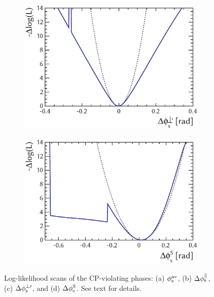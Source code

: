 \begin{figure}[tb]
  \vspace*{0.02\textwidth}
  \begin{subfigure}{0.49\textwidth}
    \includegraphics[width=\textwidth]{graphics/results/NLL_polarDep_phiCPRel_AperpApar}
    \caption{}
    \label{fig:NLL_CPV_phases_phiCPRel_AperpApar}
  \end{subfigure}
  \hfill%
  \begin{subfigure}{0.49\textwidth}
    \includegraphics[width=\textwidth]{graphics/results/NLL_polarDep_phiCPRel_AS}
    \caption{}
  \end{subfigure}

  \caption{Log-likelihood scans of the CP-violating phases: (a) $\phi_\text{s}^{\text{av}}$, (b) $\Delta\phi_\text{s}^{\parallel}$, (c) $\Delta\phi_\text{s}^{\perp\prime}$, and (d) $\Delta\phi_\text{s}^{\text{S}}$.
           See text for details.}
  \label{fig:NLL_CPV_phases}
\end{figure}

